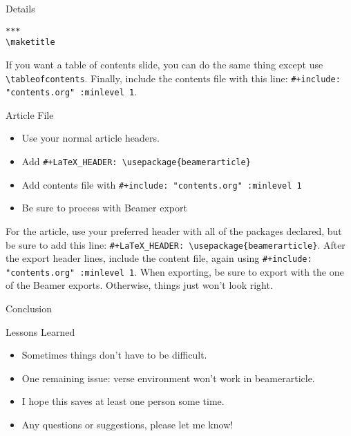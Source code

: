 \documentclass[11pt]{article}
\begin{document}
\begin{frame}[label={sec:org67b5962},fragile]{Details}
\begin{verbatim}
***
\maketitle
\end{verbatim}


If you want a table of contents slide, you can do the same thing except use \texttt{\textbackslash{}tableofcontents}. Finally, include the contents file with this line: \texttt{\#+include: "contents.org" :minlevel 1}.


\begin{block}{Article File}
\begin{itemize}
\item Use your normal article headers.
\item Add \texttt{\#+LaTeX\_HEADER: \textbackslash{}usepackage\{beamerarticle\}}
\item Add contents file with \texttt{\#+include: "contents.org" :minlevel 1}
\item Be sure to process with Beamer export
\end{itemize}
\end{block}

For the article, use your preferred header with all of the packages declared, but be sure to add this line: \texttt{\#+LaTeX\_HEADER: \textbackslash{}usepackage\{beamerarticle\}}. After the export header lines, include the content file, again using \texttt{\#+include: "contents.org" :minlevel 1}. When exporting, be sure to export with the one of the Beamer exports. Otherwise, things just won't look right.
\end{frame}

\begin{frame}[label={sec:orgacab0f4}]{Conclusion}
\begin{block}{Lessons Learned}
\begin{itemize}
\item Sometimes things don't have to be difficult.
\item One remaining issue: verse environment won't work in beamerarticle.
\item I hope this saves at least one person some time.
\item Any questions or suggestions, please let me know!
\end{itemize}
\end{block}
\end{frame}
\end{document}
